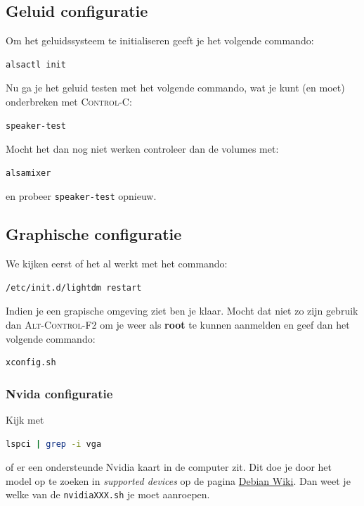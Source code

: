 \documentclass[12pt,a4paper]{article}
\begin{document}
\subsection{Geluid configuratie}

Om het geluidssysteem te initialiseren geeft je het volgende commando:

\begin{lstlisting}[language=bash]
alsactl init
\end{lstlisting}

Nu ga je het geluid testen met het volgende commando, wat je kunt (en moet) onderbreken met \textsc{Control-C}:

\begin{lstlisting}[language=bash]
speaker-test
\end{lstlisting}

Mocht het dan nog niet werken controleer dan de volumes met:

\begin{lstlisting}[language=bash]
alsamixer
\end{lstlisting}

en probeer \texttt{speaker-test} opnieuw.


\subsection{Graphische configuratie}

We kijken eerst of het al werkt met het commando:

\begin{lstlisting}[language=bash]
/etc/init.d/lightdm restart
\end{lstlisting}

Indien je een grapische omgeving ziet ben je klaar. Mocht dat niet zo zijn gebruik dan \textsc{Alt-Control-F2} om je weer als \textbf{root} te kunnen aanmelden en geef dan het volgende commando:


\begin{lstlisting}[language=bash]
xconfig.sh
\end{lstlisting}

\subsubsection{Nvida configuratie}

Kijk met 
\begin{lstlisting}[language=bash]
lspci | grep -i vga
\end{lstlisting}
of er een ondersteunde Nvidia kaart in de computer zit. Dit doe je door het model op te zoeken in \textit{supported devices} op de pagina \href{https://wiki.debian.org/NvidiaGraphicsDrivers}{Debian Wiki}. Dan weet je welke van de  \texttt{nvidiaXXX.sh} je moet aanroepen.
\end{document}
